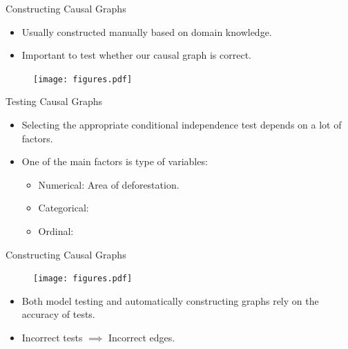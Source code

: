 \documentclass[aspectratio=169]{beamer}
\begin{document}
\begin{frame}{Constructing Causal Graphs}
	
	\vspace{2em}
	
	\begin{itemize}
		\item Usually constructed manually based on domain knowledge.
		\item Important to test whether our causal graph is correct.
	\end{itemize}
	
	\vspace{1em}
	
	\begin{figure}
		\center
		\texttt{[image: figures.pdf]}
	\end{figure}
	
\end{frame}

\begin{frame}{Testing Causal Graphs}
	\begin{itemize}
		\item Selecting the appropriate conditional independence test depends on a
	lot of factors.
		\item One of the main factors is type of variables:
			\begin{itemize}
				\item Numerical: Area of deforestation.
				\item Categorical: 
				\item Ordinal:
			\end{itemize}
	\end{itemize}

	\vspace{2em}
		
\end{frame}

\begin{frame}{Constructing Causal Graphs}
	\begin{figure}
		\center
		\texttt{[image: figures.pdf]}
	\end{figure}

	\begin{itemize}
		\item Both model testing and automatically constructing graphs rely on the accuracy of tests.
		\item Incorrect tests $ \implies $ Incorrect edges.
	\end{itemize}

	\vspace{0.5em}
	
\end{frame}
\end{document}
